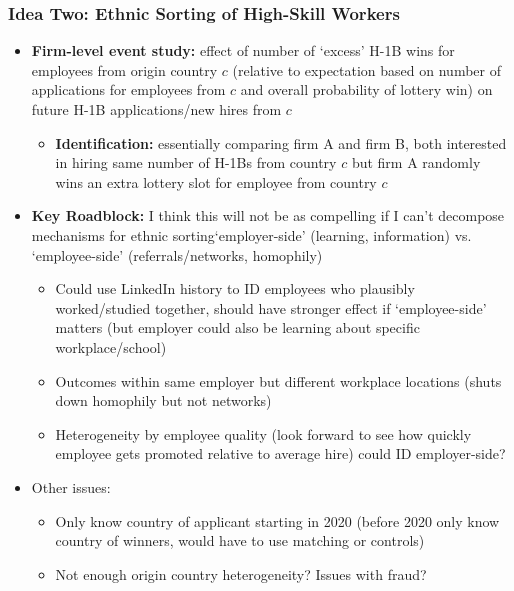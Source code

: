 \documentclass[xcolor=dvipsnames, compress, 12pt, aspectratio=169, handout]{beamer}
\begin{document}
\begin{frame}[allowframebreaks]
    \frametitle{Idea Two: Ethnic Sorting of High-Skill Workers}
    \begin{itemize}
        \item \textbf{Firm-level event study:} effect of number of `excess' H-1B wins for employees from origin country $c$ (relative to expectation based on number of applications for employees from $c$ and overall probability of lottery win) on future H-1B applications/new hires from $c$
        \begin{itemize}
            \item \textbf{Identification:} essentially comparing firm A and firm B, both interested in hiring same number of H-1Bs from country $c$ but firm A randomly wins an extra lottery slot for employee from country $c$
        \end{itemize}
        \framebreak
        \item \textbf{Key Roadblock:} I think this will not be as compelling if I can't decompose mechanisms for ethnic sorting\textemdash `employer-side' (learning, information) vs. `employee-side' (referrals/networks, homophily)
        \begin{itemize}
            \item Could use LinkedIn history to ID employees who plausibly worked/studied together, should have stronger effect if `employee-side' matters (but employer could also be learning about specific workplace/school)
            \item Outcomes within same employer but different workplace locations (shuts down homophily but not networks) 
            \item Heterogeneity by employee quality (look forward to see how quickly employee gets promoted relative to average hire) could ID employer-side?
        \end{itemize}
        \item Other issues:
        \begin{itemize}
            \item Only know country of applicant starting in 2020 (before 2020 only know country of winners, would have to use matching or controls)
            \item Not enough origin country heterogeneity? Issues with fraud?
        \end{itemize}
    \end{itemize}
\end{frame}
\end{document}
